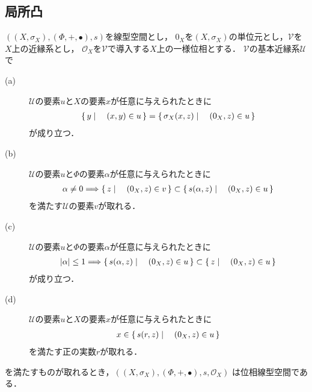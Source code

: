 \subsection{局所凸}
	\begin{screen}
		\begin{thm}[線型位相を導入する近縁系]
		\label{thm:entourages_introducing_vector_topology}
			$\left(\left(X,\sigma_X\right),(\Phi,+,\bullet),s\right)$を線型空間とし，
			$0_X$を$\left(X,\sigma_X\right)$の単位元とし，$\mathscr{V}$を$X$上の近縁系とし，
			$\mathscr{O}_X$を$\mathscr{V}$で導入する$X$上の一様位相とする．
			$\mathscr{V}$の基本近縁系$\mathscr{U}$で
			\begin{description}
				\item[(a)] $\mathscr{U}$の要素$u$と$X$の要素$x$が任意に与えられたときに
					\begin{align}
						\left\{\, y \mid \quad (x,y) \in u\, \right\} = \left\{\, \sigma_X(x,z) \mid \quad (0_X,z) \in u\, \right\}
					\end{align}
					が成り立つ．
					
				\item[(b)] $\mathscr{U}$の要素$u$と$\Phi$の要素$\alpha$が任意に与えられたときに
					\begin{align}
						\alpha \neq 0 \Longrightarrow \left\{\, z \mid \quad (0_X,z) \in v\, \right\} \subset \left\{\, s(\alpha,z) \mid \quad (0_X,z) \in u\, \right\}
					\end{align}
					を満たす$\mathscr{U}$の要素$v$が取れる．
					
				\item[(c)] $\mathscr{U}$の要素$u$と$\Phi$の要素$\alpha$が任意に与えられたときに
					\begin{align}
						|\alpha| \leq 1 \Longrightarrow \left\{\, s(\alpha,z) \mid \quad (0_X,z) \in u\, \right\} \subset \left\{\, z \mid \quad (0_X,z) \in u\, \right\}
					\end{align}
					が成り立つ．
					
				\item[(d)] $\mathscr{U}$の要素$u$と$X$の要素$x$が任意に与えられたときに
					\begin{align}
						x \in \left\{\, s(r,z) \mid \quad (0_X,z) \in u\, \right\}
					\end{align}
					を満たす正の実数$r$が取れる．
			\end{description}
			を満たすものが取れるとき，$\left(\left(X,\sigma_X\right),(\Phi,+,\bullet),s,\mathscr{O}_X\right)$
			は位相線型空間である．
		\end{thm}
	\end{screen}
	
